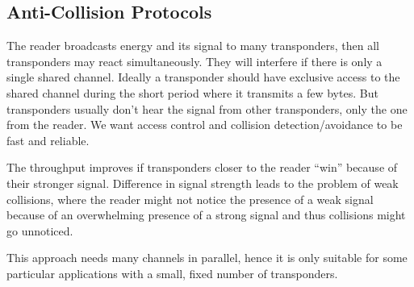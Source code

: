 \subsection{Anti-Collision Protocols}
\begin{mytitle} The reader broadcasts energy and its signal to many transponders, then all transponders may react simultaneously. They will interfere if there is only a single shared channel. Ideally a transponder should have exclusive access to the shared channel during the short period where it transmits a few bytes. But transponders usually don't hear the signal from other transponders, only the one from the reader. We want access control and collision detection/avoidance to be fast and reliable.
\end{mytitle}
\begin{mytitle} The throughput improves if transponders closer to the reader ``win'' because of their stronger signal. Difference in signal strength leads to the problem of weak collisions, where the reader might not notice the presence of a weak signal because of an overwhelming presence of a strong signal and thus collisions might go unnoticed.
\end{mytitle}
\begin{mytitle} This approach needs many channels in parallel, hence it is only suitable for some particular applications with a small, fixed number of transponders.
\end{mytitle}
